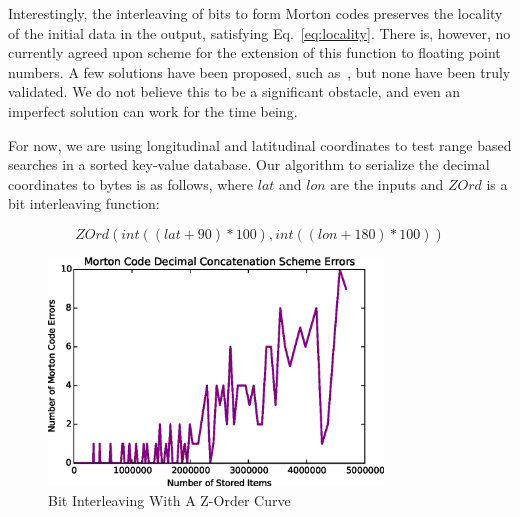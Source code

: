\documentclass[10pt]{IEEEtran}
\begin{document}
\par Interestingly, the interleaving of bits to form Morton codes preserves the locality of the initial data in the output, satisfying Eq.~\ref{eq:locality}. There is, however, no currently agreed upon scheme for the extension of this function to floating point numbers. A few solutions have been proposed, such as~\cite{Connor:2010eq}, but none have been truly validated. We do not believe this to be a significant obstacle, and even an imperfect solution can work for the time being.

\par For now, we are using longitudinal and latitudinal coordinates to test range based searches in a sorted key-value database. Our algorithm to serialize the decimal coordinates to bytes is as follows, where $lat$ and $lon$ are the inputs and $ZOrd$ is a bit interleaving function:

\begin{equation} \label{eq:serialization}
ZOrd(int((lat + 90) * 100), int((lon + 180) * 100))
\end{equation}

\begin{figure}[!t]
\centering
\includegraphics[width=3.5in]{errors.eps}
\caption{Bit Interleaving With A Z-Order Curve}
\label{fig_ZOrd}
\end{figure}
\end{document}
